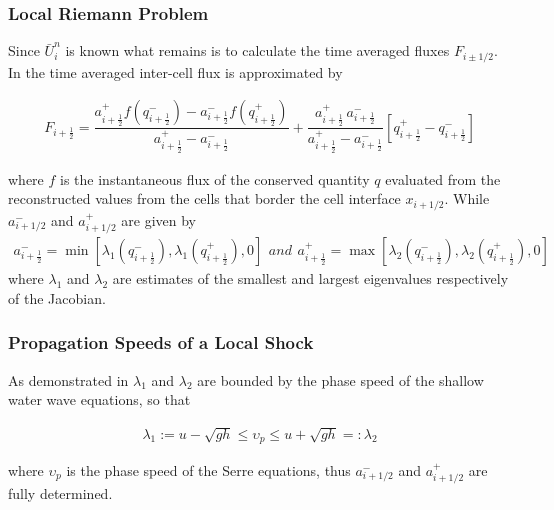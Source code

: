 \documentclass[SingleSpace,12pt]{Serre_ASCE}
\begin{document}
\subsubsection{Local Riemann Problem} %
Since $\bar{U}^{n}_i$ is known what remains is to calculate the time averaged fluxes $F_{i \pm 1/2}$. In  the time averaged inter-cell flux is approximated by
\begin{linenomath*}
\begin{gather}\label{eq:HLL_flux}
F_{i+\frac{1}{2}} = \dfrac{a^+_{i+\frac{1}{2}} f\left(q^-_{i+\frac{1}{2}}\right) - a^-_{i+\frac{1}{2}} f\left(q^+_{i+\frac{1}{2}}\right)}{a^+_{i+\frac{1}{2}} - a^-_{i+\frac{1}{2}}}  + \dfrac{a^+_{i+\frac{1}{2}} \, a^-_{i+\frac{1}{2}}}{a^+_{i+\frac{1}{2}} - a^-_{i+\frac{1}{2}}} \left [ q^+_{i+\frac{1}{2}} - q^-_{i+\frac{1}{2}} \right ]
\end{gather}
\end{linenomath*}
where $f$ is the instantaneous flux of the conserved quantity $q$ evaluated from the reconstructed values from the cells that border the cell interface $x_{i + 1/2}$. While $a^-_{i+1/2}$ and $a^+_{i+1/2}$ are given by
\begin{subequations}
\begin{gather}
a^-_{i+\frac{1}{2}} = \min \left[\lambda_1\left(q^-_{i + \frac{1}{2}}\right), \lambda_1\left(q^+_{i + \frac{1}{2}}\right), 0 \right]
\label{eq:aatcelledgep}
\end{gather}
and
\begin{gather}
a^+_{i+\frac{1}{2}} = \max \left[\lambda_2\left(q^-_{i + \frac{1}{2}}\right), \lambda_2\left(q^+_{i + \frac{1}{2}}\right), 0 \right]
\label{eq:aatcelledgem}
\end{gather}
\end{subequations}
where $\lambda_1$ and $\lambda_2$ are estimates of the smallest and largest eigenvalues respectively of the Jacobian.
\subsubsection{Propagation Speeds of a Local Shock} %
As demonstrated in  $\lambda_1$ and $\lambda_2$ are bounded by the phase speed of the shallow water wave equations, so that
\begin{linenomath*}
\begin{gather}
 \lambda_1 := u - \sqrt{gh} \le \upsilon_p \le u + \sqrt{gh} =: \lambda_2
\end{gather}
\end{linenomath*}
where $\upsilon_p$ is the phase speed of the Serre equations, thus $a^-_{i+1/2}$ and $a^+_{i+1/2}$ are fully determined.
\end{document}
